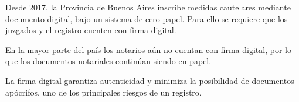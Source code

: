 \documentclass[12pt]{book}
\begin{document}
Desde 2017, la Provincia de Buenos Aires inscribe medidas cautelares mediante documento digital, bajo un sistema de cero papel. Para ello se requiere que los juzgados y el registro cuenten con firma digital.

En la mayor parte del pa\'is los notarios a\'un no cuentan con firma digital, por lo que los documentos notariales contin\'uan siendo en papel.

La firma digital garantiza autenticidad y minimiza la posibilidad de documentos ap\'ocrifos, uno de los principales riesgos de un registro.
\end{document}
